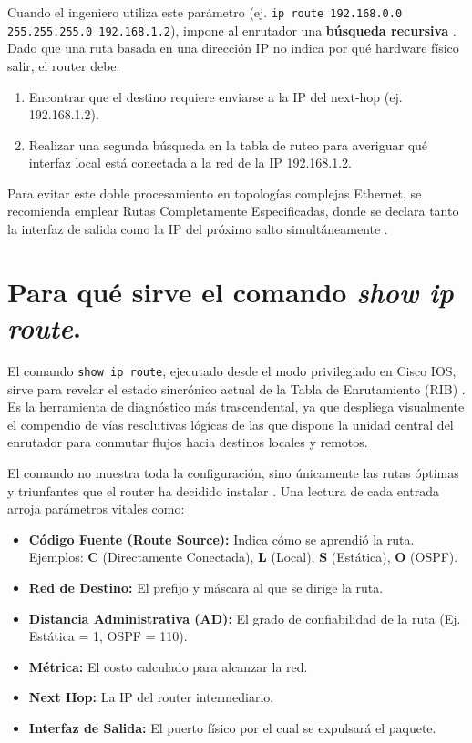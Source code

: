 \documentclass[a4paper,12pt]{article}
\begin{document}
Cuando el ingeniero utiliza este parámetro (ej. \texttt{ip route 192.168.0.0 255.255.255.0 192.168.1.2}), impone al enrutador una \textbf{búsqueda recursiva} \cite{ccnadesdecero_static}. Dado que una ruta basada en una dirección IP no indica por qué hardware físico salir, el router debe:
\begin{enumerate}
    \item Encontrar que el destino requiere enviarse a la IP del next-hop (ej. 192.168.1.2).
    \item Realizar una segunda búsqueda en la tabla de ruteo para averiguar qué interfaz local está conectada a la red de la IP 192.168.1.2.
\end{enumerate}
Para evitar este doble procesamiento en topologías complejas Ethernet, se recomienda emplear Rutas Completamente Especificadas, donde se declara tanto la interfaz de salida como la IP del próximo salto simultáneamente \cite{moreluznet_nexthop}.

\newpage

\section{Para qué sirve el comando \textit{show ip route}.}

El comando \texttt{show ip route}, ejecutado desde el modo privilegiado en Cisco IOS, sirve para revelar el estado sincrónico actual de la Tabla de Enrutamiento (RIB) \cite{cisco_showiproute}. Es la herramienta de diagnóstico más trascendental, ya que despliega visualmente el compendio de vías resolutivas lógicas de las que dispone la unidad central del enrutador para conmutar flujos hacia destinos locales y remotos.

El comando no muestra toda la configuración, sino únicamente las rutas óptimas y triunfantes que el router ha decidido instalar \cite{librosnetworking_showiproute}. Una lectura de cada entrada arroja parámetros vitales como:
\begin{itemize}
    \item \textbf{Código Fuente (Route Source):} Indica cómo se aprendió la ruta. Ejemplos: \textbf{C} (Directamente Conectada), \textbf{L} (Local), \textbf{S} (Estática), \textbf{O} (OSPF).
    \item \textbf{Red de Destino:} El prefijo y máscara al que se dirige la ruta.
    \item \textbf{Distancia Administrativa (AD):} El grado de confiabilidad de la ruta (Ej. Estática = 1, OSPF = 110).
    \item \textbf{Métrica:} El costo calculado para alcanzar la red.
    \item \textbf{Next Hop:} La IP del router intermediario.
    \item \textbf{Interfaz de Salida:} El puerto físico por el cual se expulsará el paquete.
\end{itemize}
\end{document}
